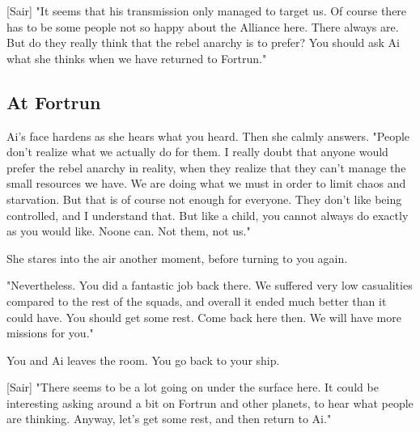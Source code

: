 \documentclass[a4paper,12pt]{article}
\begin{document}
[Sair] "It seems that his transmission only managed to target us. Of course there has to
be some people not so happy about the Alliance here. There always are. But do they really
think that the rebel anarchy is to prefer? You should ask Ai what she thinks when we have
returned to Fortrun."

\subsection{At Fortrun}

Ai's face hardens as she hears what you heard. Then she calmly answers. "People don't
realize what we actually do for them. I really doubt that anyone would prefer the rebel
anarchy in reality, when they realize that they can't manage the small resources we have.
We are doing what we must in order to limit chaos and starvation. But that is of course
not enough for everyone. They don't like being controlled, and I understand that.
But like a child, you cannot always do exactly as you would like. Noone can. Not them, not us."

She stares into the air another moment, before turning to you again.

"Nevertheless. You did a fantastic job back there. We suffered very low casualities compared
to the rest of the squads, and overall it ended much better than it could have. You should
get some rest. Come back here then. We will have more missions for you."

You and Ai leaves the room. You go back to your ship.

[Sair] "There seems to be a lot going on under the surface here. It could be interesting
asking around a bit on Fortrun and other planets, to hear what people are thinking. Anyway,
let's get some rest, and then return to Ai."
\end{document}
